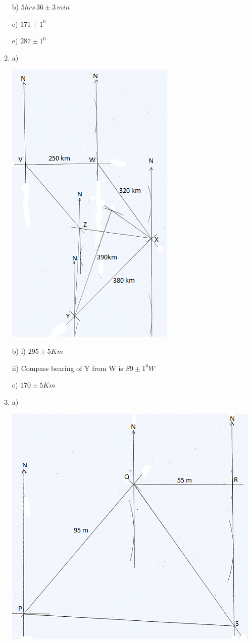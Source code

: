 \documentclass[
  a4paperpaper,
]{scrbook}
\begin{document}
\begin{tcolorbox}
\begin{enumerate}
  b) \(5hrs \,36\pm3\,min\)

  c) \(171\pm1^0\)

  e) \(287\pm1^0\)
\item
  a)

  \includegraphics{figures/12Q.png}

  b) i) \(295\pm5Km\)

  ii) Compass bearing of Y from W is \(S9\pm1^0W\)

  c) \(170\pm5Km\)
\item
  a)

  \includegraphics{figures/13Q.png}


\end{enumerate}
\end{tcolorbox}
\end{document}
